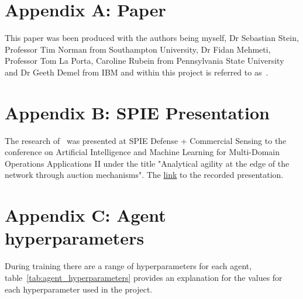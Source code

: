 
\section*{Appendix A: Paper} \label{app:paper}
This paper was been produced with the authors being myself, Dr Sebastian Stein, Professor Tim Norman from Southampton
University, Dr Fidan Mehmeti, Professor Tom La Porta, Caroline Rubein from Pennsylvania State University and Dr Geeth
Demel from IBM and within this project is referred to as~\cite{FlexibleResourceAllocation}.



\section*{Appendix B: SPIE Presentation} \label{app:spie-presentation}
The research of~\cite{FlexibleResourceAllocation} was presented at SPIE Defense + Commercial Sensing to the conference
on Artificial Intelligence and Machine Learning for Multi-Domain Operations Applications II under the title
"Analytical agility at the edge of the network through auction mechanisms". The
\href{https://spie.org/SI/conferencedetails/artificial-intelligence-and-machine-learning-for-multi-domain-battle-applications#2560056}{link}
to the recorded presentation.



\section*{Appendix C: Agent hyperparameters} \label{app:agent-hyperparameters}
During training there are a range of hyperparameters for each agent, table~\ref{tab:agent_hyperparameters} provides
an explanation for the values for each hyperparameter used in the project.

